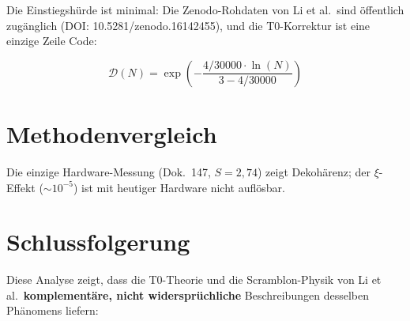 Die Einstiegshürde ist minimal: Die Zenodo-Rohdaten von Li et al.\ sind öffentlich zugänglich (DOI: 10.5281/zenodo.16142455), und die T0-Korrektur ist eine einzige Zeile Code:

\begin{equation}
	\mathcal{D}(N) = \exp\left(-\frac{4/30000 \cdot \ln(N)}{3 - 4/30000}\right)
\end{equation}


\section{Methodenvergleich}
\label{sec:methods}

\begin{table}[h]
	\centering
	\caption{Systematischer Vergleich: Scramblon-Theorie vs.\ T0-Projektion}
	\label{tab:method_comparison}
\end{table}
Die einzige Hardware-Messung (Dok.~147, $S = 2{,}74$) zeigt Dekohärenz; der $\xi$-Effekt ($\sim 10^{-5}$) ist mit heutiger Hardware nicht auflösbar.


\section{Schlussfolgerung}
\label{sec:conclusion}

Diese Analyse zeigt, dass die T0-Theorie und die Scramblon-Physik von Li et al.\ \textbf{komplementäre, nicht widersprüchliche} Beschreibungen desselben Phänomens liefern:


